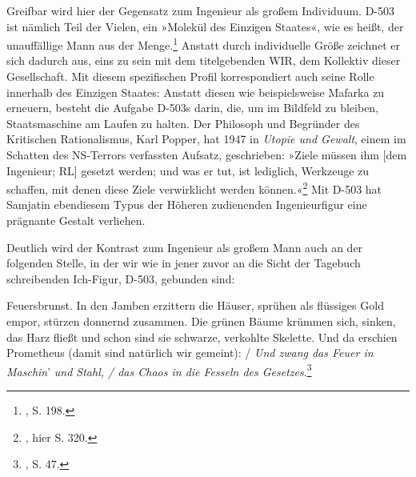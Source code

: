 \documentclass[%
	fontsize=10pt,%
	twoside,%
	headings=optiontoheadandtoc,%
	showtrims]{scrbook}
\renewenvironment{quote}{%
  \addmargin[\genericindent]{0pt}%
  \KOMAoptions{parskip=true}%
  \ifdim\parskip>0pt\else\addvspace{\intextsep}\fi
}{%
  \par
  \endaddmargin\vspace{\intextsep}
}
\begin{document}
\par Greifbar wird hier der Gegensatz zum Ingenieur als großem Individuum. D-503 ist nämlich Teil der Vielen, ein »Molekül des Einzigen Staates«, wie es heißt, der unauffällige Mann aus der Menge.\footnote{\cite[][]{samjatin2003a}, S. 198.}  Anstatt durch individuelle Größe zeichnet er sich dadurch aus, eins zu sein mit dem titelgebenden WIR, dem Kollektiv dieser Gesellschaft. Mit diesem spezifischen Profil korrespondiert auch seine Rolle innerhalb des Einzigen Staates: Anstatt diesen \textendash{} wie beispielsweise Mafarka \textendash{} zu erneuern, besteht die Aufgabe D-503s darin, die, um im Bildfeld zu bleiben, Staatsmaschine am Laufen zu halten. Der Philosoph und Begründer des Kritischen Rationalismus, Karl Popper, hat 1947 in \emph{Utopie und Gewalt}, einem im Schatten des NS-Terrors verfassten Aufsatz, geschrieben: »Ziele müssen ihm {[}dem Ingenieur; RL{]} gesetzt werden; und was er tut, ist lediglich, Werkzeuge zu schaffen, mit denen diese Ziele verwirklicht werden können.«\footnote{\cite[][]{popper1968a}, hier S. 320.}  Mit D-503 hat Samjatin ebendiesem Typus der Höheren zudienenden Ingenieurfigur eine prägnante Gestalt verliehen.\par Deutlich wird der Kontrast zum Ingenieur als großem Mann auch an der folgenden Stelle, in der wir wie in jener zuvor an die Sicht der Tagebuch schreibenden Ich-Figur, D-503, gebunden sind:\begin{quote}
\par Feuersbrunst. In den Jamben erzittern die Häuser, sprühen als flüssiges Gold empor, stürzen donnernd zusammen. Die grünen Bäume krümmen sich, sinken, das Harz fließt \textendash{} und schon sind sie schwarze, verkohlte Skelette. Und da erschien Prometheus (damit sind natürlich wir gemeint): / \emph{Und zwang das Feuer in Maschin}\textquoteright{} \emph{und Stahl, / das Chaos in die Fesseln des Gesetzes}.\footnote{\cite[][]{samjatin2003a}, S. 47.} 
\end{quote}
\end{document}
